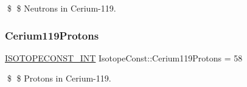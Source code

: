 \$ \$ Neutrons in Cerium-\/119. \mbox{\label{group___isotope_const-_cerium-_ce119_gacaab63dfda2af49326920de210dbc219}} 
\subsubsection{\texorpdfstring{Cerium119\+Protons}{Cerium119Protons}}
{\footnotesize\ttfamily \mbox{\hyperlink{group___isotope_const-_macros_ga5f18360b3e99483a35c32d789e62621c}{I\+S\+O\+T\+O\+P\+E\+C\+O\+N\+S\+T\+\_\+\+I\+NT}} Isotope\+Const\+::\+Cerium119\+Protons = 58}

\$ \$ Protons in Cerium-\/119. 